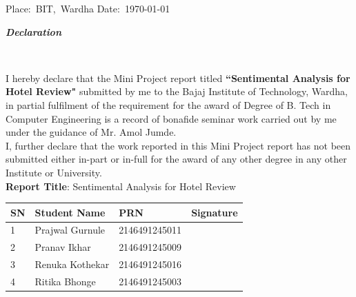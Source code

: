 \documentclass[a4paper, 12pt]{report}
\begin{document}
\begin{frontmatter}
\begin{titlepage}
\hbox {Place: BIT, Wardha\\}
\hbox {Date: \today\\}
\end{titlepage}


\thispagestyle{empty}
\begin{center}
\begin{LARGE}
	\textbf{\textit {Declaration}}\end{LARGE}\\[1.2cm]
\end{center}
I hereby declare that the Mini Project report titled \textbf{``Sentimental Analysis for   Hotel Review"} submitted by me to the Bajaj Institute of Technology, Wardha, in partial fulfilment of the requirement for the award of Degree of B. Tech in Computer Engineering is a record of bonafide seminar work carried out by me under the guidance of Mr. Amol Jumde.\\

I, further declare that the work reported in this Mini Project report has not been submitted either in-part or in-full for the award of any other degree in any other Institute or University.\\

{\flushleft\textbf{Report Title}: Sentimental Analysis for Hotel Review}\\
\begin{table}[h]
	\begin{tabular}{|p{1cm}|p{5cm}|p{3cm}|p{4cm}|}
		\hline
		\textbf{SN} & \textbf{Student Name} & \textbf{PRN} & \textbf{Signature} \\
		\hline
		1 &Prajwal Gurnule &2146491245011 & \\
		\hline
		2 &Pranav Ikhar &2146491245009 & \\
		\hline
		3 &Renuka Kothekar &2146491245016 & \\
		\hline
		4 &Ritika Bhonge &2146491245003 & \\
		\hline
	\end{tabular}
\end{table}


\end{frontmatter}
\end{document}
